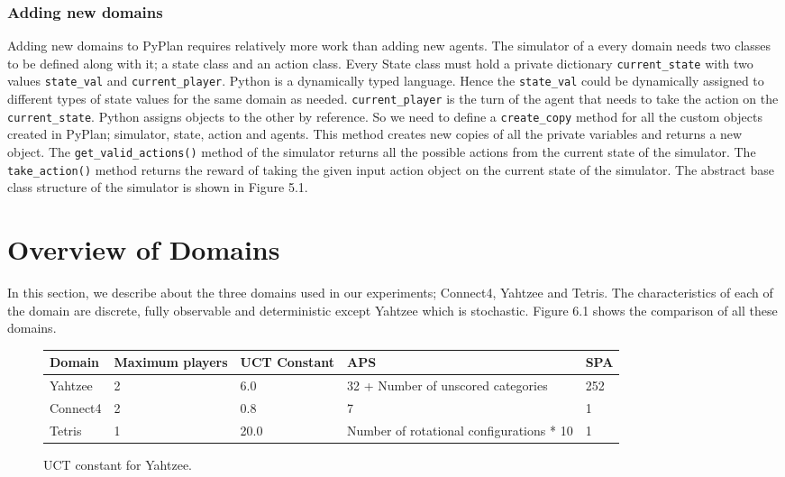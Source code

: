 \documentclass[double,12pt]{beavtex}
\begin{document}
\subsection{Adding new domains}
Adding new domains to PyPlan requires relatively more work than adding new agents. The simulator of a every domain needs two classes to be defined along with it; a state class and an action class. Every State class must hold a private dictionary \verb|current_state| with two values \verb|state_val| and \verb|current_player|. Python is a dynamically typed language. Hence the \verb|state_val| could be dynamically assigned to different types of state values for the same domain as needed. \verb|current_player| is the turn of the agent that needs to take the action on the \verb|current_state|. Python assigns objects to the other by reference. So we need to define a \verb|create_copy| method for all the custom objects created in PyPlan; simulator, state, action and agents. This method creates new copies of all the private variables and returns a new object. The \verb|get_valid_actions()| method of the simulator returns all the possible actions from the current state of the simulator. The \verb|take_action()| method returns the reward of taking the given input action object on the current state of the simulator. The abstract base class structure of the simulator is shown in Figure 5.1.

\chapter{Overview of Domains}
In this section, we describe about the three domains used in our experiments; Connect4, Yahtzee and Tetris. The characteristics of each of the domain are discrete, fully observable and deterministic except Yahtzee which is stochastic. Figure 6.1 shows the comparison of all these domains.

\begin{figure}[!ht]
\centering
 \begin{tabular}{|p{2cm}|p{2cm}|p{2cm}|p{2cm}|p{2cm}|} 
 \hline
 Domain & Maximum players & UCT Constant & APS & SPA \\ 
 \hline
Yahtzee & 2 & 6.0 & 32 + Number of unscored categories & 252 \\
 \hline
Connect4 & 2 & 0.8 & 7 & 1 \\ 
\hline
Tetris & 1 & 20.0 & Number of rotational configurations * 10 & 1 \\
 \hline
\end{tabular}
\caption{UCT constant for Yahtzee.}
\end{figure}
\end{document}
